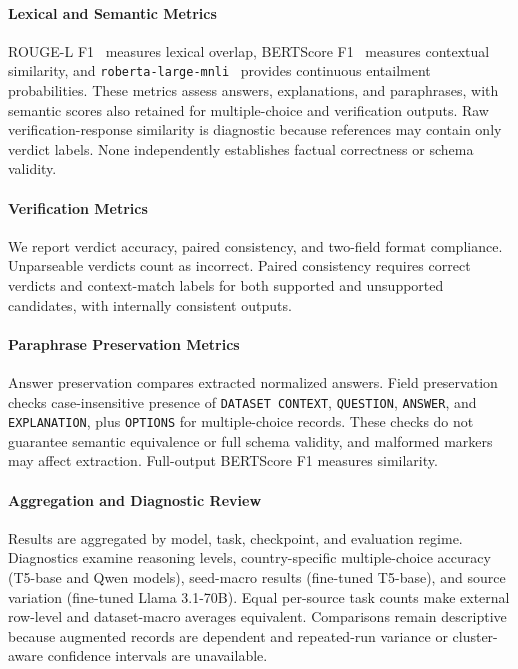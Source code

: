 \documentclass[a4paper,fleqn]{cas-sc}
\begin{document}
\paragraph{Lexical and Semantic Metrics}
ROUGE-L F1~\cite{lin2004rouge} measures lexical overlap, BERTScore F1~\cite{zhang2020bertscore} measures contextual similarity, and \texttt{roberta-large-mnli}~\cite{liu2019roberta,williams2018broad} provides continuous entailment probabilities. These metrics assess answers, explanations, and paraphrases, with semantic scores also retained for multiple-choice and verification outputs. Raw verification-response similarity is diagnostic because references may contain only verdict labels. None independently establishes factual correctness or schema validity.

\paragraph{Verification Metrics}
We report verdict accuracy, paired consistency, and two-field format compliance. Unparseable verdicts count as incorrect. Paired consistency requires correct verdicts and context-match labels for both supported and unsupported candidates, with internally consistent outputs.

\paragraph{Paraphrase Preservation Metrics}
Answer preservation compares extracted normalized answers. Field preservation checks case-insensitive presence of \texttt{DATASET CONTEXT}, \texttt{QUESTION}, \texttt{ANSWER}, and \texttt{EXPLANATION}, plus \texttt{OPTIONS} for multiple-choice records. These checks do not guarantee semantic equivalence or full schema validity, and malformed markers may affect extraction. Full-output BERTScore F1 measures similarity.

\paragraph{Aggregation and Diagnostic Review}
Results are aggregated by model, task, checkpoint, and evaluation regime. Diagnostics examine reasoning levels, country-specific multiple-choice accuracy (T5-base and Qwen models), seed-macro results (fine-tuned T5-base), and source variation (fine-tuned Llama 3.1-70B). Equal per-source task counts make external row-level and dataset-macro averages equivalent. Comparisons remain descriptive because augmented records are dependent and repeated-run variance or cluster-aware confidence intervals are unavailable.
\end{document}
